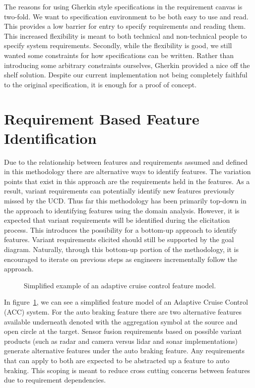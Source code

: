 The reasons for using Gherkin style specifications in the requirement canvas is two-fold. We want to specification environment to be both easy to use and read. This provides a low barrier for entry to specify requirements and reading them. This increased flexibility is meant to both technical and non-technical people to specify system requirements. Secondly, while the flexibility is good, we still wanted some constraints for how specifications can be written. Rather than introducing some arbitrary constraints ourselves, Gherkin provided a nice off the shelf solution. Despite our current implementation not being completely faithful to the original specification, it is enough for a proof of concept.

\section{Requirement Based Feature Identification}

Due to the relationship between features and requirements assumed and defined in this methodology there are alternative ways to identify features. The variation points that exist in this approach are the requirements held in the features. As a result, variant requirements can potentially identify new features previously missed by the \ac{UCD}. Thus far this methodology has been primarily top-down in the approach to identifying features using the domain analysis. However, it is expected that variant requirements will be identified during the elicitation process. This introduces the possibility for a bottom-up approach to identify features. Variant requirements elicited should still be supported by the goal diagram. Naturally, through this bottom-up portion of the methodology, it is encouraged to iterate on previous steps as engineers incrementally follow the approach.

\begin{figure}
	\centering
	
	\caption{Simplified example of an adaptive cruise control feature model.}
	\label{fig:acc_fm}
\end{figure}

In figure~\ref{fig:acc_fm}, we can see a simplified feature model of an Adaptive Cruise Control (ACC) system. For the auto braking feature there are two alternative features available underneath denoted with the aggregation symbol at the source and open circle at the target. Sensor fusion requirements based on possible variant products (such as radar and camera versus lidar and sonar implementations) generate alternative features under the auto braking feature. Any requirements that can apply to both are expected to be abstracted up a feature to auto braking. This scoping is meant to reduce cross cutting concerns between features due to requirement dependencies.

